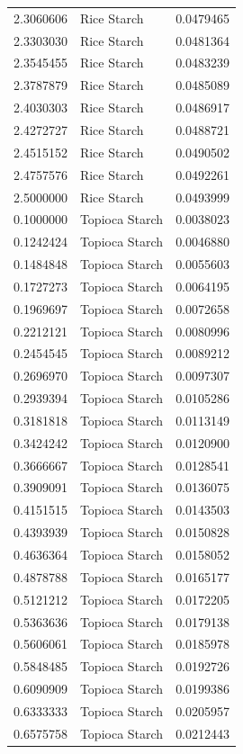 \documentclass[
  12pt,
]{article}
\begin{document}
{\begin{longtable}[]{@{}rlr@{}}
2.3060606 & Rice Starch & 0.0479465 \\
2.3303030 & Rice Starch & 0.0481364 \\
2.3545455 & Rice Starch & 0.0483239 \\
2.3787879 & Rice Starch & 0.0485089 \\
2.4030303 & Rice Starch & 0.0486917 \\
2.4272727 & Rice Starch & 0.0488721 \\
2.4515152 & Rice Starch & 0.0490502 \\
2.4757576 & Rice Starch & 0.0492261 \\
2.5000000 & Rice Starch & 0.0493999 \\
0.1000000 & Topioca Starch & 0.0038023 \\
0.1242424 & Topioca Starch & 0.0046880 \\
0.1484848 & Topioca Starch & 0.0055603 \\
0.1727273 & Topioca Starch & 0.0064195 \\
0.1969697 & Topioca Starch & 0.0072658 \\
0.2212121 & Topioca Starch & 0.0080996 \\
0.2454545 & Topioca Starch & 0.0089212 \\
0.2696970 & Topioca Starch & 0.0097307 \\
0.2939394 & Topioca Starch & 0.0105286 \\
0.3181818 & Topioca Starch & 0.0113149 \\
0.3424242 & Topioca Starch & 0.0120900 \\
0.3666667 & Topioca Starch & 0.0128541 \\
0.3909091 & Topioca Starch & 0.0136075 \\
0.4151515 & Topioca Starch & 0.0143503 \\
0.4393939 & Topioca Starch & 0.0150828 \\
0.4636364 & Topioca Starch & 0.0158052 \\
0.4878788 & Topioca Starch & 0.0165177 \\
0.5121212 & Topioca Starch & 0.0172205 \\
0.5363636 & Topioca Starch & 0.0179138 \\
0.5606061 & Topioca Starch & 0.0185978 \\
0.5848485 & Topioca Starch & 0.0192726 \\
0.6090909 & Topioca Starch & 0.0199386 \\
0.6333333 & Topioca Starch & 0.0205957 \\
0.6575758 & Topioca Starch & 0.0212443 \\

\end{longtable}}
\end{document}
